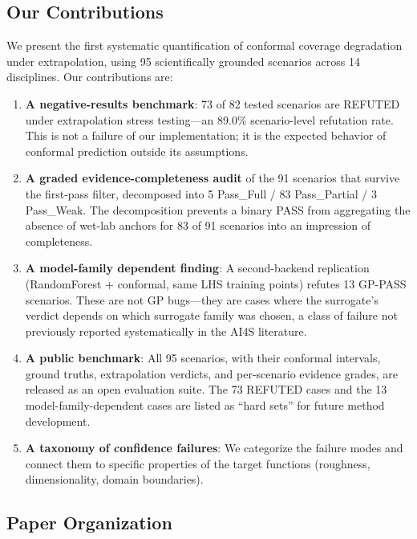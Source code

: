 \documentclass[journal]{IEEEtran}
\begin{document}
\subsection{Our Contributions}

We present the first systematic quantification of conformal coverage
degradation under extrapolation, using 95 scientifically grounded scenarios
across 14 disciplines. Our contributions are:

\begin{enumerate}
    \item \textbf{A negative-results benchmark}: 73 of 82 tested scenarios are
    REFUTED under extrapolation stress testing---an 89.0\% scenario-level
    refutation rate. This is not a failure of our implementation; it is the
    expected behavior of conformal prediction outside its assumptions.

    \item \textbf{A graded evidence-completeness audit} of the 91 scenarios
    that survive the first-pass filter, decomposed into 5 Pass\_Full / 83
    Pass\_Partial / 3 Pass\_Weak. The decomposition prevents a binary PASS
    from aggregating the absence of wet-lab anchors for 83 of 91 scenarios
    into an impression of completeness.

    \item \textbf{A model-family dependent finding}: A second-backend
    replication (RandomForest + conformal, same LHS training points) refutes
    13 GP-PASS scenarios. These are not GP bugs---they are cases where the
    surrogate's verdict depends on which surrogate family was chosen, a class
    of failure not previously reported systematically in the AI4S literature.

    \item \textbf{A public benchmark}: All 95 scenarios, with their conformal
    intervals, ground truths, extrapolation verdicts, and per-scenario evidence
    grades, are released as an open evaluation suite. The 73 REFUTED cases and
    the 13 model-family-dependent cases are listed as ``hard sets'' for future
    method development.

    \item \textbf{A taxonomy of confidence failures}: We categorize the
    failure modes and connect them to specific properties of the target
    functions (roughness, dimensionality, domain boundaries).
\end{enumerate}

\subsection{Paper Organization}
\end{document}
